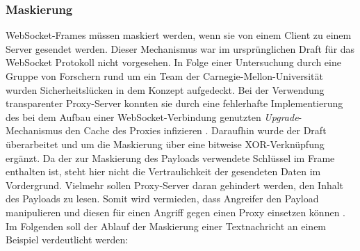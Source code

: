 \documentclass[11pt,a4paper,titlepage]{scrartcl}
\numberwithin{equation}{section}
\begin{document}
\subsubsection*{Maskierung}\label{subsubsec:wsMasking}
WebSocket-Frames müssen maskiert werden, wenn sie von einem Client zu einem Server gesendet werden. Dieser Mechanismus war im ursprünglichen Draft für das WebSocket Protokoll nicht vorgesehen. In Folge einer Untersuchung durch eine Gruppe von Forschern rund um ein Team der Carnegie-Mellon-Universität wurden Sicherheitslücken in dem Konzept aufgedeckt. Bei der Verwendung transparenter Proxy-Server konnten sie durch eine fehlerhafte Implementierung des bei dem Aufbau einer WebSocket-Verbindung genutzten \textit{Upgrade}-Mechanismus den Cache des Proxies infizieren \autocite{huang_talking_2011}. Daraufhin wurde der Draft überarbeitet und um die Maskierung über eine bitweise XOR-Verknüpfung ergänzt. Da der zur Maskierung des Payloads verwendete Schlüssel im Frame enthalten ist, steht hier nicht die Vertraulichkeit der gesendeten Daten im Vordergrund. Vielmehr sollen Proxy-Server daran gehindert werden, den Inhalt des Payloads zu lesen. Somit wird vermieden, dass Angreifer den Payload manipulieren und diesen für einen Angriff gegen einen Proxy einsetzen können \autocite{gorski_websockets_2015}.  Im Folgenden soll der Ablauf der Maskierung einer Textnachricht an einem Beispiel verdeutlicht werden:\\
\end{document}
